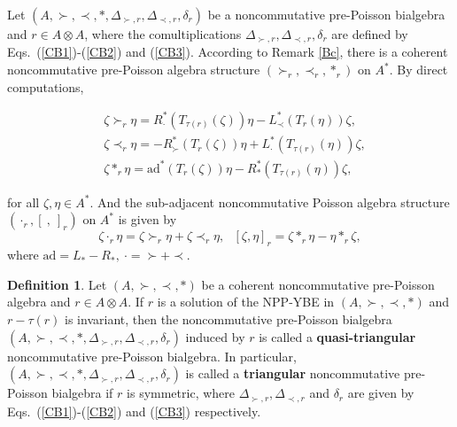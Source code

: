 \documentclass[12pt]{amsart}
\theoremstyle{definition}
\newtheorem{defi}[thm]{Definition}
\begin{document}
Let $(A, \succ,\prec,\ast,\Delta_{\succ,r},\Delta_{\prec,r},\delta_r)$ be a noncommutative pre-Poisson bialgebra and $r\in A\otimes A$, 
where the comultiplications
$\Delta_{\succ,r},\Delta_{\prec,r},\delta_r$ are defined by Eqs.~(\ref{CB1})-(\ref{CB2}) and (\ref{CB3}). According to 
Remark \ref{Bc}, there is a coherent noncommutative pre-Poisson algebra structure $(\succ_r,\prec_r,\ast_r)$ on $A^{*}$.
By direct computations, \begin{small}
\begin{align}&\label{Ic1}\zeta\succ_{r}\eta=R_{\cdot}^{*}(T_{\tau(r)}(\zeta))\eta-L_{\prec}^{*}(T_{r}(\eta))\zeta,
\\&\label{Ic2}\zeta\prec_{r}\eta=-R_{\succ}^{*}(T_{r}(\zeta))\eta+L_{\cdot}^{*} (T_{\tau(r)}(\eta))\zeta,\\&
\label{Ic3}\zeta\ast_{r}\eta=\mathrm{ad}^{*} (T_{r}(\zeta))\eta-R_{\ast}^{*}(T_{\tau(r)}(\eta))\zeta, 
\end{align}
\end{small}
for all $\zeta,\eta\in A^{*}$. And the sub-adjacent noncommutative Poisson 
algebra structure $(\cdot_r,[ \ , \ ]_{r})$ on $A^{*}$ is
given by 
\begin{equation*}\zeta\cdot_{r}\eta=\zeta\succ_{r}\eta+\zeta\prec_{r}\eta
, \ \ \ [ \zeta , \eta ]_{r}=\zeta\ast_{r}\eta-\eta\ast_{r}\zeta,
\end{equation*}
where $\mathrm{ad}=L_{\ast}-R_{\ast},~ \cdot=\succ+\prec$.

\begin{defi} \label{Qt1}
 Let $(A,\succ,\prec,\ast)$ be a coherent noncommutative pre-Poisson algebra 
 and $r\in A\otimes A$. If $r$ is a solution of the NPP-YBE in $(A,\succ,\prec,\ast)$
 and $r-\tau(r)$ is invariant, then the noncommutative pre-Poisson 
  bialgebra $(A, \succ,\prec,\ast,\Delta_{\succ,r},\Delta_{\prec,r},\delta_{r})$ induced by $r$
   is called a {\bf quasi-triangular} noncommutative pre-Poisson
 bialgebra. In particular, $(A, \succ,\prec,\ast,\Delta_{\succ,r},\Delta_{\prec,r},\delta_{r})$
is called a {\bf triangular} noncommutative pre-Poisson bialgebra if $r$ is symmetric, 
where $\Delta_{\succ,r},\Delta_{\prec,r}$ and $\delta_{r}$ 
are given by Eqs.~(\ref{CB1})-(\ref{CB2}) and (\ref{CB3}) respectively.
\end{defi}
\end{document}
